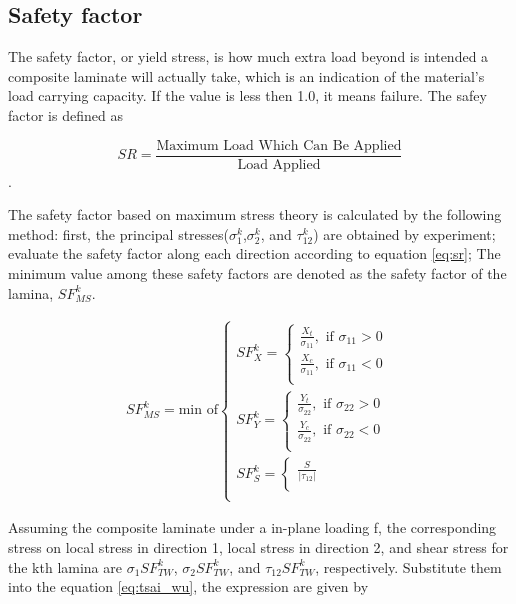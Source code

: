 \subsection{Safety factor}
The safety factor, or yield stress, is how much extra load beyond is intended a
composite laminate will actually take, which is an indication of the material's
load carrying capacity. If the value is less then 1.0, it means failure. The safey factor is defined as 

\begin{equation} \label{eq:sr}S R=\frac{\text {Maximum Load Which Can Be Applied}}{\text {Load Applied}}
\end{equation}.

The safety factor based on maximum stress theory is calculated by the following
method: first, the principal stresses($\sigma_1^k$,$\sigma_2^k$, and
$\tau_{12}^k$) are obtained by experiment; evaluate the safety factor along each
direction according to equation \ref{eq:sr}; The minimum value among these
safety factors are denoted as the safety factor of the lamina, $SF_{MS}^k$.

\begin{align}
	SF_{MS}^k = \text{min of}
	\begin{cases}
		SF_X^k = 
		\begin{cases}
			\frac{X_t}{\sigma_{11}}, \text{ if } \sigma_{11}>0 \\
			\frac{X_c}{\sigma_{11}}, \text{ if } \sigma_{11}<0 \\
		\end{cases} \\
		SF_Y^k = 
		\begin{cases}
			\frac{Y_t}{\sigma_{22}}, \text{ if } \sigma_{22}>0 \\
			\frac{Y_c}{\sigma_{22}}, \text{ if } \sigma_{22}<0 \\
		\end{cases} \\
		SF_S^k =
		\begin{cases}
			\frac{S}{|\tau_{12}|} \\
		\end{cases} \\
	\end{cases}
\end{align}


Assuming the composite laminate under a in-plane loading f, the corresponding
stress on local stress in direction 1, local stress in direction 2, and shear
stress for the kth lamina are $\sigma_1 SF_{TW}^k$, $\sigma_2SF_{TW}^k$, and $\tau_{12}SF_{TW}^k$,
respectively. Substitute them into the equation \ref{eq:tsai_wu}, the expression
are given by

